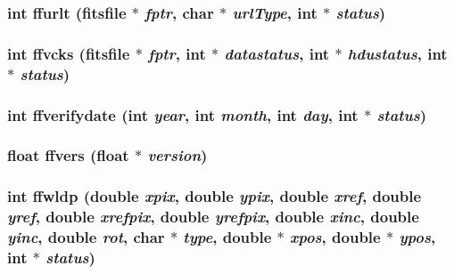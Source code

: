 \subsubsection{\setlength{\rightskip}{0pt plus 5cm}int ffurlt (\bf{fitsfile} $\ast$ {\em fptr}, char $\ast$ {\em url\-Type}, int $\ast$ {\em status})}\label{fitsio_8h_64dfbe3d89deaba3358478ef9da6cf9d}


\subsubsection{\setlength{\rightskip}{0pt plus 5cm}int ffvcks (\bf{fitsfile} $\ast$ {\em fptr}, int $\ast$ {\em datastatus}, int $\ast$ {\em hdustatus}, int $\ast$ {\em status})}\label{fitsio_8h_78bc390746f669a461a78c81ed6d188c}


\subsubsection{\setlength{\rightskip}{0pt plus 5cm}int ffverifydate (int {\em year}, int {\em month}, int {\em day}, int $\ast$ {\em status})}\label{fitsio_8h_80394f484665daa6cc2baf0176437ca8}


\subsubsection{\setlength{\rightskip}{0pt plus 5cm}float ffvers (float $\ast$ {\em version})}\label{fitsio_8h_85c66845501bf130675ce90fede1adb4}


\subsubsection{\setlength{\rightskip}{0pt plus 5cm}int ffwldp (double {\em xpix}, double {\em ypix}, double {\em xref}, double {\em yref}, double {\em xrefpix}, double {\em yrefpix}, double {\em xinc}, double {\em yinc}, double {\em rot}, char $\ast$ {\em type}, double $\ast$ {\em xpos}, double $\ast$ {\em ypos}, int $\ast$ {\em status})}\label{fitsio_8h_d38a3e4f83b4c618ce413d89f7115e45}


